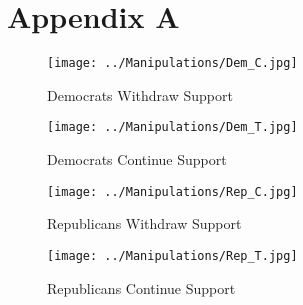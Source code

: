\documentclass[12pt]{article}
\begin{document}
\section*{Appendix A}


\begin{figure}[ht]
\centering
\begin{minipage}[b][12cm][b]{0.45\linewidth}
\texttt{[image: ../Manipulations/Dem\_C.jpg]}
\caption{Democrats Withdraw Support}
\label{fig:minipage1}
\end{minipage}
\quad
\begin{minipage}[b]{0.45\linewidth}
\texttt{[image: ../Manipulations/Dem\_T.jpg]}
\caption{Democrats Continue Support}
\label{fig:minipage2}
\end{minipage}
\end{figure}

\begin{figure}[ht]
\centering
\begin{minipage}[b][12cm][b]{0.45\linewidth}
\texttt{[image: ../Manipulations/Rep\_C.jpg]}
\caption{Republicans Withdraw Support}
\label{fig:minipage3}
\end{minipage}
\quad
\begin{minipage}[b]{0.45\linewidth}
\texttt{[image: ../Manipulations/Rep\_T.jpg]}
\caption{Republicans Continue Support}
\label{fig:minipage4}
\end{minipage}
\end{figure}
\end{document}
